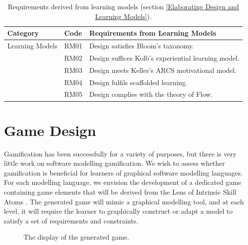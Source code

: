 \documentclass[12pt, a4paper]{report}
\begin{document}
\begin{table}[ht]
\caption{Requirements derived from learning models (section \ref{Elaborating Design and Learning Models}).}
\label{design-learning-models}
\begin{center}
\begin{tabular}{ p{2cm}p{1cm}p{10cm} } 
\hline
Category & Code & Requirements from Learning Models \\
\hline
\multirow{1}{2cm}{Learning Models} 
& RM01 & Design satisfies Bloom's taxonomy. \\
& RM02 & Design suffices Kolb's experiential learning model. \\ 
& RM03 & Design meets Keller's ARCS motivational model. \\
& RM04 & Design fulfils scaffolded learning. \\
& RM05 & Design complies with the theory of Flow. \\ 
\hline
\end{tabular}
\end{center}
\end{table}


\section{Game Design}
\label{Game Design}
Gamification has been successfully for a variety of purposes, but there is very little work on software modelling gamification. We wish to assess whether gamification is beneficial for learners of graphical software modelling languages. For each modelling language, we envision the development of a dedicated game containing game elements that will be derived from the Lens of Intrinsic Skill Atoms \cite{deterding2015lens}. The generated game will mimic a graphical modelling tool, and at each level, it will require the learner to graphically construct or adapt a model to satisfy a set of requirements and constraints.

\begin{figure}[ht]
\centering
{}
\caption{The display of the generated game.}
\label{fig:001}
\end{figure}
\end{document}
